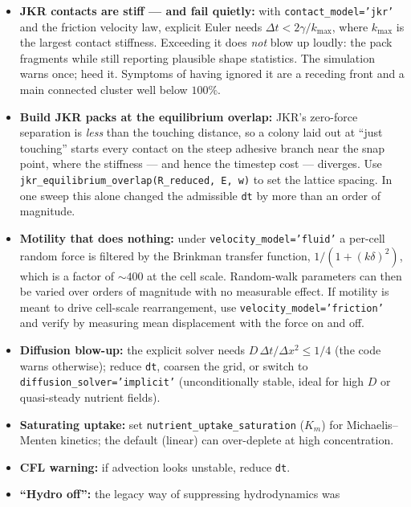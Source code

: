 \documentclass[11pt]{article}
\newcommand{\code}[1]{\texttt{#1}}
\begin{document}
\begin{itemize}
  \item \textbf{JKR contacts are stiff --- and fail quietly:} with
        \code{contact\_model='jkr'} and the friction velocity law, explicit
        Euler needs $\Delta t < 2\gamma/k_{\max}$, where $k_{\max}$ is the
        largest contact stiffness. Exceeding it does \emph{not} blow up loudly:
        the pack fragments while still reporting plausible shape statistics. The
        simulation warns once; heed it. Symptoms of having ignored it are a
        receding front and a main connected cluster well below $100\%$.
  \item \textbf{Build JKR packs at the equilibrium overlap:} JKR's zero-force
        separation is \emph{less} than the touching distance, so a colony laid
        out at ``just touching'' starts every contact on the steep adhesive
        branch near the snap point, where the stiffness --- and hence the
        timestep cost --- diverges. Use
        \code{jkr\_equilibrium\_overlap(R\_reduced, E, w)} to set the lattice
        spacing. In one sweep this alone changed the admissible \code{dt} by more
        than an order of magnitude.
  \item \textbf{Motility that does nothing:} under
        \code{velocity\_model='fluid'} a per-cell random force is filtered by the
        Brinkman transfer function, $1/(1+(k\delta)^2)$, which is a factor of
        $\sim\!400$ at the cell scale. Random-walk parameters can then be varied
        over orders of magnitude with no measurable effect. If motility is meant
        to drive cell-scale rearrangement, use \code{velocity\_model='friction'}
        and verify by measuring mean displacement with the force on and off.
  \item \textbf{Diffusion blow-up:} the explicit solver needs
        $D\,\Delta t/\Delta x^2 \le 1/4$ (the code warns otherwise); reduce
        \code{dt}, coarsen the grid, or switch to
        \code{diffusion\_solver='implicit'} (unconditionally stable, ideal for
        high $D$ or quasi-steady nutrient fields).
  \item \textbf{Saturating uptake:} set \code{nutrient\_uptake\_saturation}
        ($K_m$) for Michaelis--Menten kinetics; the default (linear) can
        over-deplete at high concentration.
  \item \textbf{CFL warning:} if advection looks unstable, reduce \code{dt}.
  \item \textbf{``Hydro off'':} the legacy way of suppressing hydrodynamics was

\end{itemize}
\end{document}
